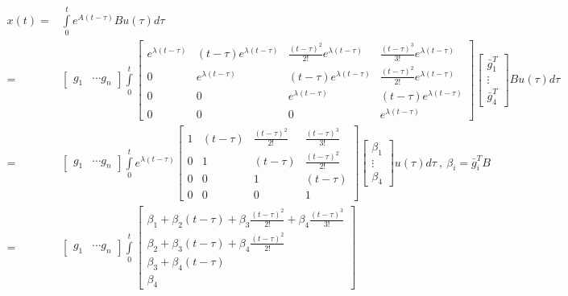 \documentclass[twoside]{article}
\begin{document}
%
%
\begin{align*}
	x(t) =& \int\limits_{0}^{t} e^{A ( t - \tau ) } B u(\tau) d \tau 
	\\
	=& \left[ \begin{array}{ccc} g_1 & \cdots g_n \end{array} \right] \int\limits_{0}^{t} 
\begin{bmatrix} e^{\lambda (t - \tau)} & (t-\tau) e^{\lambda (t-\tau)} & \frac{(t-\tau)^2}{2 !} e^{\lambda (t-\tau)} & \frac{(t-\tau)^3}{3 !} e^{\lambda (t-\tau)}
\\ 0 & e^{\lambda (t-\tau)} & (t-\tau) e^{\lambda (t-\tau)} & \frac{(t-\tau)^2}{2 !} e^{\lambda (t-\tau)} \\ 0 & 0 & e^{\lambda (t-\tau)} & (t-\tau) e^{\lambda (t-\tau)} \\ 0 & 0 & 0 & e^{\lambda (t-\tau)} \end{bmatrix} 
%
	\left[ \begin{array}{c} \bar{g}_1^T \\  \vdots \\ \bar{g}_4^T \end{array} \right]  B u(\tau) d \tau
\\
=& \left[ \begin{array}{ccc} g_1 & \cdots g_n \end{array} \right] \int\limits_{0}^{t} 
e^{\lambda (t - \tau)} \begin{bmatrix} 1 & (t-\tau)  & \frac{(t-\tau)^2}{2 !}  & \frac{(t-\tau)^3}{3 !} 
\\ 0 & 1 & (t-\tau)  & \frac{(t-\tau)^2}{2 !}  \\ 0 & 0 & 1 & (t-\tau)  \\ 0 & 0 & 0 & 1 \end{bmatrix} 
%
	\left[ \begin{array}{c} \beta_1 \\  \vdots \\ \beta_4 \end{array} \right] u(\tau) d \tau \ , \ \beta_i = \bar{g}_i^T B
\\
=& \left[ \begin{array}{ccc} g_1 & \cdots g_n \end{array} \right] \int\limits_{0}^{t} 
\begin{bmatrix} \beta_1 + \beta_2 (t-\tau) +  \beta_3 \frac{(t-\tau)^2}{2 !} + \beta_4 \frac{(t-\tau)^3}{3 !} 
\\  \beta_2 + \beta_3 (t-\tau)  + \beta_4 \frac{(t-\tau)^2}{2 !}  \\ \beta_3 + \beta_4 (t-\tau)  \\ \beta_4  \end{bmatrix} 

\end{align*}
\end{document}
